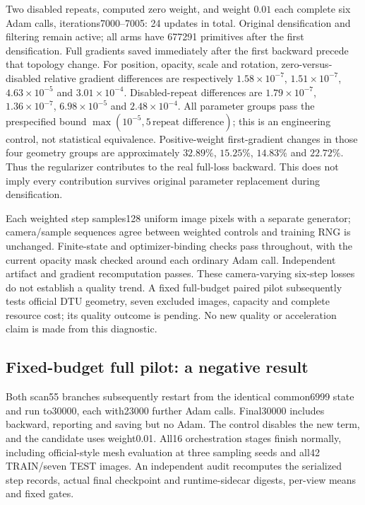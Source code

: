 \documentclass[11pt,a4paper]{article}
\begin{document}
Two disabled repeats, computed zero weight, and weight $0.01$ each
complete six Adam calls, iterations7000--7005: 24 updates in total.
Original densification and filtering remain active; all arms have
677291 primitives after the first densification. Full gradients saved
immediately after the first backward precede that topology change.
For position, opacity, scale and rotation, zero-versus-disabled relative
gradient differences are respectively $1.58\times10^{-7}$,
$1.51\times10^{-7}$, $4.63\times10^{-5}$ and $3.01\times10^{-4}$.
Disabled-repeat differences are $1.79\times10^{-7}$,
$1.36\times10^{-7}$, $6.98\times10^{-5}$ and $2.48\times10^{-4}$.
All parameter groups pass the prespecified bound
$\max(10^{-5},5\,\text{repeat difference})$; this is an engineering
control, not statistical equivalence. Positive-weight first-gradient
changes in those four geometry groups are approximately $32.89\%$,
$15.25\%$, $14.83\%$ and $22.72\%$. Thus the regularizer contributes
to the real full-loss backward. This does not imply every contribution
survives original parameter replacement during densification.

Each weighted step samples128 uniform image pixels with a separate
generator; camera/sample sequences agree between weighted controls and
training RNG is unchanged. Finite-state and optimizer-binding checks
pass throughout, with the current opacity mask checked around each
ordinary Adam call. Independent artifact and gradient recomputation
passes. These camera-varying six-step losses do not establish a quality
trend. A fixed full-budget paired pilot subsequently tests official DTU
geometry, seven excluded images, capacity and complete resource cost;
its quality outcome is pending. No new quality or acceleration claim
is made from this diagnostic.

\subsection{Fixed-budget full pilot: a negative result}
Both scan55 branches subsequently restart from the identical common6999
state and run to30000, each with23000 further Adam calls. Final30000
includes backward, reporting and saving but no Adam. The control disables
the new term, and the candidate uses weight0.01. All16 orchestration
stages finish normally, including official-style mesh evaluation at
three sampling seeds and all42 TRAIN/seven TEST images. An independent
audit recomputes the serialized step records, actual final checkpoint
and runtime-sidecar digests, per-view means and fixed gates.
\end{document}
